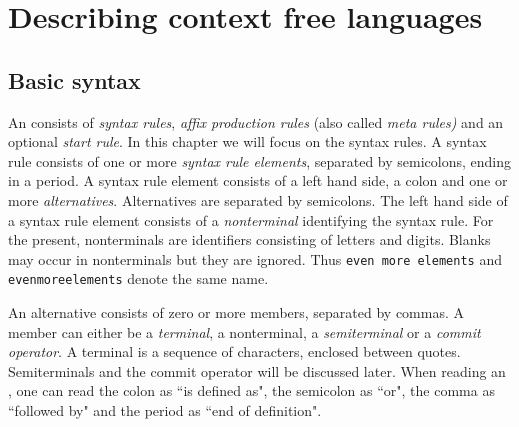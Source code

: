 \chapter {Describing context free languages}
\section {Basic syntax}
An \EAG consists of {\em syntax rules\/}, {\em affix production
rules} (also called {\em meta rules)} and an optional {\em start rule}.
In this chapter we will focus on the syntax rules. A syntax rule
consists of one or more {\em syntax rule elements}, separated by
semicolons, ending in a period. A syntax rule element consists of
a left hand side, a colon and one or more {\em alternatives}.
Alternatives are separated by semicolons. The left hand side of a
syntax rule element consists of a {\em nonterminal} identifying
the syntax rule. For the present, nonterminals are identifiers
consisting of letters and digits. Blanks may occur in nonterminals
but they are ignored. Thus {\tt even more elements} and
{\tt evenmoreelements} denote the same name.

An alternative consists of zero or more members, separated by commas.
A member can either be a {\em terminal}, a nonterminal, a {\em semiterminal}
or a {\em commit operator}.  A terminal is a sequence of characters,
enclosed between quotes. Semiterminals and the commit operator will
be discussed later. When reading an \EAGns, one can
read the colon as ``is defined as", the semicolon as ``or",
the comma as ``followed by" and the period as ``end of definition".

